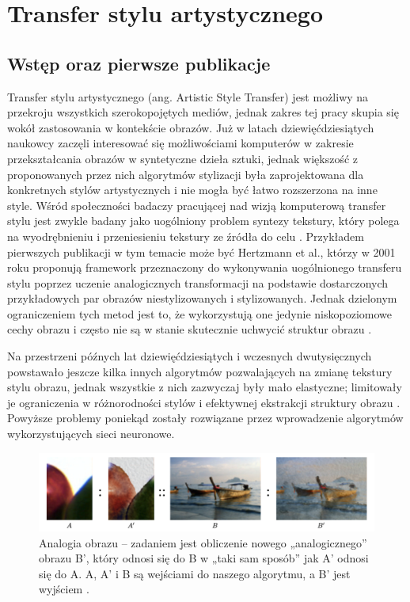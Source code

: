\documentclass[12pt]{article}
\begin{document}
\section{Transfer stylu artystycznego}

\subsection{Wstęp oraz pierwsze publikacje}

\indent

Transfer stylu artystycznego (ang. Artistic Style Transfer) jest możliwy na przekroju wszystkich szerokopojętych mediów, jednak zakres tej pracy skupia się wokół zastosowania w kontekście obrazów. Już w latach dziewięćdziesiątych naukowcy zaczęli interesować się możliwościami komputerów w zakresie przekształcania obrazów w syntetyczne dzieła sztuki, jednak większość z proponowanych przez nich algorytmów stylizacji była zaprojektowana dla konkretnych stylów artystycznych i nie mogła być łatwo rozszerzona na inne style. Wśród społeczności badaczy pracującej nad wizją komputerową transfer stylu jest zwykle badany jako uogólniony problem syntezy tekstury, który polega na wyodrębnieniu i przeniesieniu tekstury ze źródła do celu \cite{22}. Przykładem pierwszych publikacji w tym temacie może być Hertzmann et al., którzy w 2001 roku proponują framework przeznaczony do wykonywania uogólnionego transferu stylu poprzez uczenie analogicznych transformacji na podstawie dostarczonych przykładowych par obrazów niestylizowanych i stylizowanych. Jednak dzielonym ograniczeniem tych metod jest to, że wykorzystują one jedynie niskopoziomowe cechy obrazu i często nie są w stanie skutecznie uchwycić struktur obrazu \cite{23}.

Na przestrzeni późnych lat dziewięćdziesiątych i wczesnych dwutysięcznych powstawało jeszcze kilka innych algorytmów pozwalających na zmianę tekstury stylu obrazu, jednak wszystkie z nich zazwyczaj były mało elastyczne; limitowały je ograniczenia w różnorodności stylów i efektywnej ekstrakcji struktury obrazu \cite{25,26,27,28}. Powyższe problemy poniekąd zostały rozwiązane przez wprowadzenie algorytmów wykorzystujących sieci neuronowe.
\begin{figure}[H]
    \centering
    \includegraphics[width=\textwidth]{u6.png}
    \caption{Analogia obrazu – zadaniem jest obliczenie nowego „analogicznego” obrazu B', który odnosi się do B w „taki sam sposób” jak A' odnosi się do A. A, A' i B są wejściami do naszego algorytmu, a B' jest wyjściem \cite{23}.}
    \label{fig:3}
\end{figure}
\end{document}
